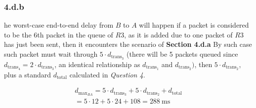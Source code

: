 \documentclass[12pt]{article}
\begin{document}
\subsubsection{4.d.b}
he worst-case end-to-end delay from $B$ to $A$ will happen if a packet is considered to be the 6th packet in the queue of $R3$, as it is added due to one packet of $R3$ has just been sent, then it encounters the scenario of \textbf{Section 4.d.a} By such case such packet must wait through $5 \cdot d_{\text{trans}_{3}}$ (there will be 5 packets queued since $d_{\text{trans}_{4}} = 2 \cdot d_{\text{trans}_{3}}$, an identical relationship as $d_{\text{trans}_{1}}$ and $d_{\text{trans}_{2}})$, then $5 \cdot d_{\text{trans}_{2}}$, plus a standard $d_{\text{total}}$ calculated in \textit{Question 4}.



\begin{gather}
    d_{\text{max}_{BA}} = 5 \cdot d_{\text{trans}_{3}} + 5 \cdot d_{\text{trans}_{2}}  + d_{\text{total}} \\
    = 5 \cdot 12 + 5 \cdot 24+ 108 = 288 \ \text{ms} \nonumber
\end{gather}

%
% 
% 
\end{document}
